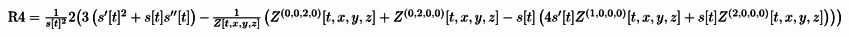 \documentclass{article}
\begin{document}
\begin{doublespace}
\noindent\(\pmb{\text{R4} = }\\
\pmb{\frac{1}{s[t]^2}2 }\\
\pmb{\left(3 \left(s'[t]^2+s[t] s''[t]\right)-\right.}\\
\pmb{\frac{1}{Z[t,x,y,z]}}\\
\pmb{\left.\left(Z^{(0,0,2,0)}[t,x,y,z]+Z^{(0,2,0,0)}[t,x,y,z]-s[t] \left(4 s'[t] Z^{(1,0,0,0)}[t,x,y,z]+s[t] Z^{(2,0,0,0)}[t,x,y,z]\right)\right)\right)}\)
\end{doublespace}
\end{document}

